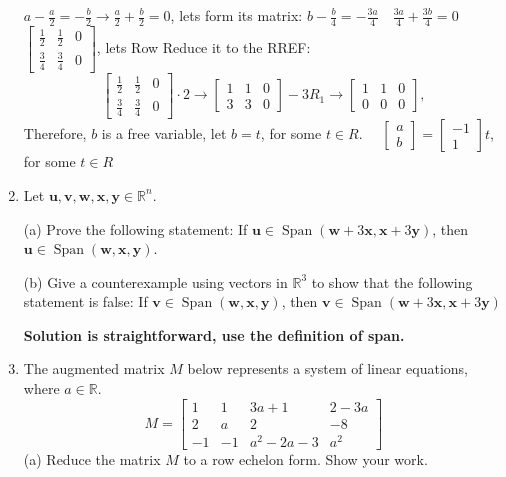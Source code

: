 \documentclass{article}
\begin{document}
\begin{enumerate}
$a-\frac{a}{2}=-\frac{b}{2} \rightarrow \frac{a}{2}+\frac{b}{2}=0$, lets form its matrix:
$b-\frac{b}{4}=-\frac{3 a}{4} \quad \frac{3 a}{4}+\frac{3 b}{4}=0$
$\left[\begin{array}{ll|l}\frac{1}{2} & \frac{1}{2} & 0 \\ \frac{3}{4} & \frac{3}{4} & 0\end{array}\right]$, lets Row Reduce it to the RREF:
$$
\left[\begin{array}{ll|l}
\frac{1}{2} & \frac{1}{2} & 0 \\
\frac{3}{4} & \frac{3}{4} & 0
\end{array}\right] \cdot 2 \rightarrow\left[\begin{array}{ll|l}
1 & 1 & 0 \\
3 & 3 & 0
\end{array}\right]-3 R_1 \rightarrow\left[\begin{array}{ll|l}
1 & 1 & 0 \\
0 & 0 & 0
\end{array}\right],
$$
Therefore, $b$ is a free variable, let $b=t$, for some $t \in R$.
$\quad\left[\begin{array}{l}a \\ b\end{array}\right]=\left[\begin{array}{c}-1 \\ 1\end{array}\right] t$, for some $t \in R$
\item Let $\mathbf{u}, \mathbf{v}, \mathbf{w}, \mathbf{x}, \mathbf{y} \in \mathbb{R}^n$.

(a) Prove the following statement:
If $\mathbf{u} \in \operatorname{Span}(\mathbf{w}+3 \mathbf{x}, \mathbf{x}+3 \mathbf{y})$, then $\mathbf{u} \in \operatorname{Span}(\mathbf{w}, \mathbf{x}, \mathbf{y})$.

(b) Give a counterexample using vectors in $\mathbb{R}^3$ to show that the following statement is false:
If $\mathbf{v} \in \operatorname{Span}(\mathbf{w}, \mathbf{x}, \mathbf{y})$, then $\mathbf{v} \in \operatorname{Span}(\mathbf{w}+3 \mathbf{x}, \mathbf{x}+3 \mathbf{y})$

\textbf{Solution is straightforward, use the definition of span.}
\item The augmented matrix $M$ below represents a system of linear equations, where $a \in \mathbb{R}$.
$$
M=\left[\begin{array}{ccc|c}
1 & 1 & 3 a+1 & 2-3 a \\
2 & a & 2 & -8 \\
-1 & -1 & a^2-2 a-3 & a^2
\end{array}\right]
$$
(a) Reduce the matrix $M$ to a row echelon form. Show your work.


\end{enumerate}
\end{document}
